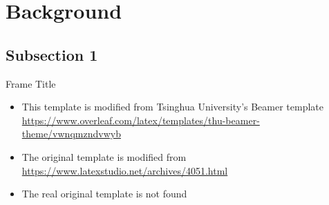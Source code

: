 \section{Background}

\subsection{Subsection 1}

\begin{frame}{Frame Title}
    \begin{itemize}%
        \item This template is modified from Tsinghua University's Beamer template
        \url{https://www.overleaf.com/latex/templates/thu-beamer-theme/vwnqmzndvwyb}
        \item The original template is modified from \newline \url{https://www.latexstudio.net/archives/4051.html}
        \item The real original template is not found \cite{origin}
    \end{itemize}
\end{frame}
